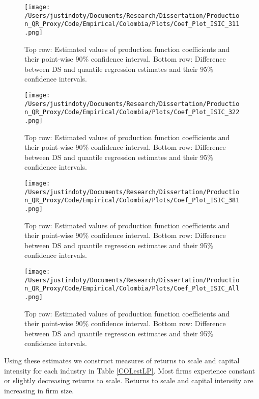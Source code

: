 \documentclass[11pt]{article}
\begin{document}
\begin{figure}[H]
\centering
\texttt{[image: /Users/justindoty/Documents/Research/Dissertation/Production\_QR\_Proxy/Code/Empirical/Colombia/Plots/Coef\_Plot\_ISIC\_311.png]}
\caption{Top row: Estimated values of production function coefficients and their point-wise 90\% confidence interval. Bottom row: Difference between DS and quantile regression estimates and their 95\% confidence intervals.}
\label{fig:COL311}
\end{figure}

\begin{figure}[H]
\centering
\texttt{[image: /Users/justindoty/Documents/Research/Dissertation/Production\_QR\_Proxy/Code/Empirical/Colombia/Plots/Coef\_Plot\_ISIC\_322.png]}
\caption{Top row: Estimated values of production function coefficients and their point-wise 90\% confidence interval. Bottom row: Difference between DS and quantile regression estimates and their 95\% confidence intervals.}
\label{fig:COL321}
\end{figure}

\begin{figure}[H]
\centering
\texttt{[image: /Users/justindoty/Documents/Research/Dissertation/Production\_QR\_Proxy/Code/Empirical/Colombia/Plots/Coef\_Plot\_ISIC\_381.png]}
\caption{Top row: Estimated values of production function coefficients and their point-wise 90\% confidence interval. Bottom row: Difference between DS and quantile regression estimates and their 95\% confidence intervals.}
\label{fig:COL381}
\end{figure}

\begin{figure}[H]
\centering
\texttt{[image: /Users/justindoty/Documents/Research/Dissertation/Production\_QR\_Proxy/Code/Empirical/Colombia/Plots/Coef\_Plot\_ISIC\_All.png]}
\caption{Top row: Estimated values of production function coefficients and their point-wise 90\% confidence interval. Bottom row: Difference between DS and quantile regression estimates and their 95\% confidence intervals.}
\label{fig:COLall}
\end{figure}

Using these estimates we construct measures of returns to scale and capital intensity for each industry in Table \ref{COLestLP}. Most firms experience constant or slightly decreasing returns to scale. Returns to scale and capital intensity are increasing in firm size.
\end{document}
